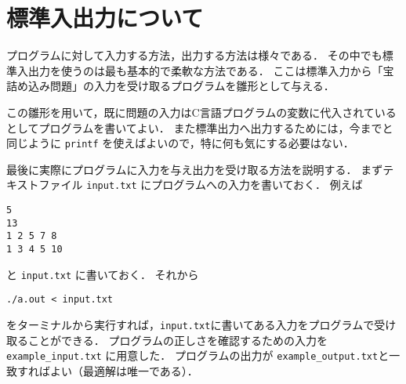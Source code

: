 \documentclass[a4paper,twoside,onecolumn,openany,article]{memoir}
\theoremstyle{remark}
\begin{document}
\section{標準入出力について}
プログラムに対して入力する方法，出力する方法は様々である．
その中でも標準入出力を使うのは最も基本的で柔軟な方法である．
ここは標準入力から「宝詰め込み問題」の入力を受け取るプログラムを雛形として与える．


この雛形を用いて，既に問題の入力はC言語プログラムの変数に代入されているとしてプログラムを書いてよい．
また標準出力へ出力するためには，今までと同じように \texttt{printf} を使えばよいので，特に何も気にする必要はない．

最後に実際にプログラムに入力を与え出力を受け取る方法を説明する．
まずテキストファイル \texttt{input.txt} にプログラムへの入力を書いておく．
例えば
\begin{verbatim}
5
13
1 2 5 7 8
1 3 4 5 10
\end{verbatim}
と \texttt{input.txt} に書いておく．
それから

\begin{verbatim}
./a.out < input.txt
\end{verbatim}
をターミナルから実行すれば，\texttt{input.txt}に書いてある入力をプログラムで受け取ることができる．
プログラムの正しさを確認するための入力を \texttt{example\_input.txt} に用意した．
プログラムの出力が \texttt{example\_output.txt}と一致すればよい（最適解は唯一である）．
\end{document}
